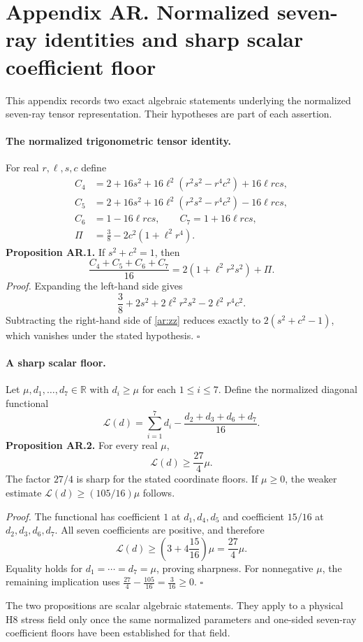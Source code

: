 \clearpage
\section*{Appendix AR. Normalized seven-ray identities and sharp scalar coefficient floor}

\noindent
This appendix records two exact algebraic statements underlying the normalized
seven-ray tensor representation. Their hypotheses are part of each assertion.

\paragraph{The normalized trigonometric tensor identity.}
For real \(r,\ell,s,c\) define
\[
\begin{aligned}
C_4&=2+16s^2+16\ell^2(r^2s^2-r^4c^2)+16\ell rcs,\\
C_5&=2+16s^2+16\ell^2(r^2s^2-r^4c^2)-16\ell rcs,\\
C_6&=1-16\ell rcs,\qquad C_7=1+16\ell rcs,\\
\Pi&=\frac38-2c^2(1+\ell^2r^4).
\end{aligned}
\]
\textbf{Proposition AR.1.}
If \(s^2+c^2=1\), then
\begin{equation}\label{ar:zz}
\frac{C_4+C_5+C_6+C_7}{16}
=2(1+\ell^2r^2s^2)+\Pi.
\end{equation}
\emph{Proof.} Expanding the left-hand side gives
\[
\frac38+2s^2+2\ell^2r^2s^2-2\ell^2r^4c^2.
\]
Subtracting the right-hand side of \eqref{ar:zz} reduces exactly to
\(2(s^2+c^2-1)\), which vanishes under the stated hypothesis. \(\square\)

\paragraph{A sharp scalar floor.}
Let \(\mu,d_1,\ldots,d_7\in\mathbb R\) with \(d_i\geq\mu\) for
each \(1\leq i\leq7\). Define the normalized diagonal functional
\[
\mathcal L(d)=\sum_{i=1}^{7}d_i-
\frac{d_2+d_3+d_6+d_7}{16}.
\]
\textbf{Proposition AR.2.}
For every real \(\mu\),
\begin{equation}\label{ar:sharp-floor}
\mathcal L(d)\geq\frac{27}{4}\mu.
\end{equation}
The factor \(27/4\) is sharp for the stated coordinate floors.
If \(\mu\geq0\), the weaker estimate
\(\mathcal L(d)\geq (105/16)\mu\) follows.

\emph{Proof.}
The functional has coefficient \(1\) at \(d_1,d_4,d_5\)
and coefficient \(15/16\) at \(d_2,d_3,d_6,d_7\).
All seven coefficients are positive, and therefore
\[
\mathcal L(d)\geq
\left(3+4\frac{15}{16}\right)\mu
=\frac{27}{4}\mu.
\]
Equality holds for \(d_1=\cdots=d_7=\mu\), proving sharpness.
For nonnegative \(\mu\), the remaining implication uses
\(\frac{27}{4}-\frac{105}{16}=\frac{3}{16}\geq0\).
\(\square\)

The two propositions are scalar algebraic statements. They apply to a
physical H8 stress field only once the same normalized parameters and
one-sided seven-ray coefficient floors have been established for that field.
